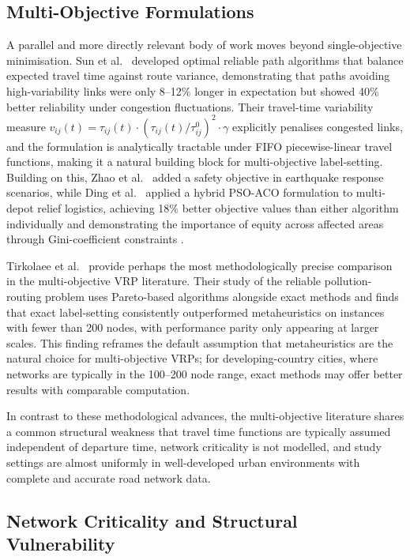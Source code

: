 \documentclass[paper=A4, 12pt, mathscr]{report}
\begin{document}
	\subsection*{Multi-Objective Formulations}
	
	A parallel and more directly relevant body of work moves beyond single-objective
	minimisation. Sun et al.\ \cite{6} developed optimal reliable path algorithms
	that balance expected travel time against route variance, demonstrating that
	paths avoiding high-variability links were only 8--12\% longer in expectation
	but showed 40\% better reliability under congestion fluctuations. Their
	travel-time variability measure $\displaystyle v_{ij}(t) = \tau_{ij}(t) \cdot
	(\tau_{ij}(t)/\tau_{ij}^0)^2 \cdot \gamma$ explicitly penalises congested
	links, and the formulation is analytically tractable under FIFO
	piecewise-linear travel functions, making it a natural building block for
	multi-objective label-setting. Building on this, Zhao et al.\ \cite{16}
	added a safety objective in earthquake response scenarios, while Ding et
	al.\ \cite{ding2021} applied a hybrid PSO-ACO formulation to multi-depot
	relief logistics, achieving 18\% better objective values than either
	algorithm individually and demonstrating the importance of equity across
	affected areas through Gini-coefficient constraints \cite{liu2022epidemic}.
	
	Tirkolaee et al.\ \cite{tirkolaee2020} provide perhaps the most methodologically
	precise comparison in the multi-objective VRP literature. Their study of the
	reliable pollution-routing problem uses Pareto-based algorithms alongside
	exact methods and finds that exact label-setting consistently outperformed
	metaheuristics on instances with fewer than 200 nodes, with performance parity
	only appearing at larger scales. This finding reframes the default assumption
	that metaheuristics are the natural choice for multi-objective VRPs; for
	developing-country cities, where networks are typically in the 100--200 node
	range, exact methods may offer better results with comparable computation.
	
	In contrast to these methodological advances, the multi-objective literature
	shares a common structural weakness that travel time functions are typically
	assumed independent of departure time, network criticality is not modelled,
	and study settings are almost uniformly in well-developed urban environments
	with complete and accurate road network data.
	
	\subsection*{Network Criticality and Structural Vulnerability}
	
\end{document}
